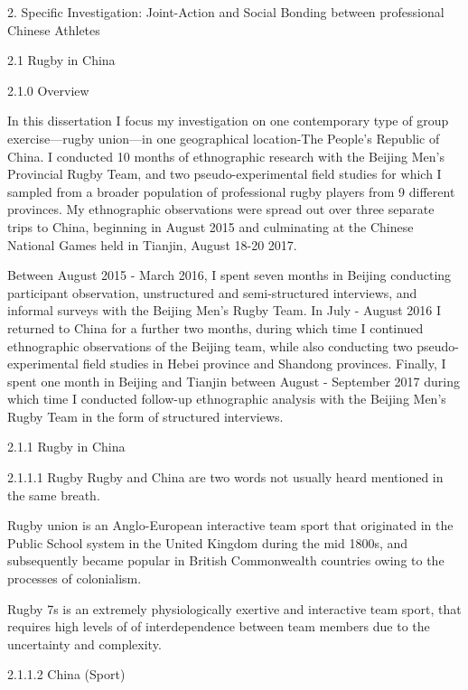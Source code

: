 \documentclass[12pt]{report}
\begin{document}
\maketitle{}


2. Specific Investigation: Joint-Action and Social Bonding between professional Chinese Athletes

  2.1 Rugby in China

    2.1.0 Overview

  In this dissertation I focus my investigation on one contemporary type of group exercise—rugby union—in one geographical location-The People's Republic of China. I conducted 10 months of ethnographic research with the Beijing Men's Provincial Rugby Team, and two pseudo-experimental field studies for which I sampled from a broader population of professional rugby players from 9 different provinces.  My ethnographic observations were spread out over three separate trips to China, beginning in August 2015 and culminating at the Chinese National Games held in Tianjin, August 18-20 2017.

	Between August 2015 - March 2016, I spent seven months in Beijing conducting participant observation, unstructured and semi-structured interviews, and informal surveys with the Beijing Men's Rugby Team. In July - August 2016 I returned to China for a further two months, during which time I continued ethnographic observations of the Beijing team, while also conducting two pseudo-experimental field studies in Hebei province and Shandong provinces. Finally, I spent one month in Beijing and Tianjin between August - September 2017 during which time I conducted follow-up ethnographic analysis with the Beijing Men's Rugby Team in the form of structured interviews.

    2.1.1 Rugby in China

        2.1.1.1 Rugby
  Rugby and China are two words not usually heard mentioned in the same breath.

  Rugby union is an Anglo-European interactive team sport that originated in the Public School system in the United Kingdom during the mid 1800s, and subsequently became popular in British Commonwealth countries owing to the processes of colonialism.

  Rugby 7s is an extremely physiologically exertive and interactive team sport, that requires high levels of of interdependence between team members due to the uncertainty and complexity.


        2.1.1.2 China (Sport)
\end{document}
